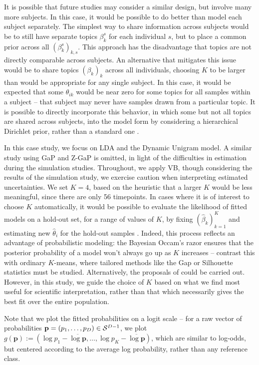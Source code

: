 \documentclass[oupdraft]{bio}
\begin{document}
It is possible that future studies may consider a similar design, but involve
many more subjects. In this case, it would be possible to do better than model
each subject separately. The simplest way to share information across subjects
would be to still have separate topics $\beta_{k}^{s}$ for each individual $s$,
but to place a common prior across all $\left(\beta_{k}^{s}\right)_{k, s}$. This
approach has the disadvantage that topics are not directly comparable across
subjects. An alternative that mitigates this issue would be to share topics
$\left(\beta_{k}\right)_{k}$ across all individuals, choosing $K$ to be larger
than would be appropriate for any single subject. In this case, it would be
expected that some $\theta_{ik}$ would be near zero for some topics for all
samples within a subject -- that subject may never have samples drawn from a
particular topic. It is possible to directly incorporate this behavior, in which
some but not all topics are shared across subjects, into the model form by
considering a hierarchical Dirichlet prior, rather than a standard one
\citep{teh2005sharing}.

In this case study, we focus on LDA and the Dynamic Unigram model. A similar
study using GaP and Z-GaP is omitted, in light of the difficulties in estimation
during the simulation studies. Throughout, we apply VB, though considering the
results of the simulation study, we exercise caution when interpreting estimated
uncertainties. We set $K = 4$, based on the heuristic that a larger $K$ would be
less meaningful, since there are only 56 timepoints. In cases where it is of
interest to choose $K$ automatically, it would be possible to evaluate the
likelihood of fitted models on a hold-out set, for a range of values of $K$, by
fixing $\left(\hat{\beta}_{k}\right)_{k = 1}^{K}$ and estimating new
$\hat{\theta}_{i}$ for the hold-out samples \citep{blei2003latent}. Indeed, this
process reflects an advantage of probabilistic modeling: the Bayesian Occam's
razor ensures that the posterior probability of a model won't always go up as
$K$ increases -- contrast this with ordinary $K$-means, where tailored methods
like the Gap or Silhouette statistics must be studied. Alternatively, the
proposals of \citep{wallach2009evaluation} could be carried out. However, in
this study, we guide the choice of $K$ based on what we find most useful for
scientific interpretation, rather than that which necessarily gives the best fit
over the entire population.

Note that we plot the fitted probabilities on a logit scale -- for a raw vector
of probabilities $\mathbf{p} = \left(p_{1}, \dots, p_{D}\right) \in
\mathcal{S}^{D - 1}$, we plot $g\left(\mathbf{p}\right) := \left(\log p_{1} -
\overline{\log \mathbf{p}}, \dots, \log p_{K} - \overline{\log
  \mathbf{p}}\right)$, which are similar to log-odds, but centered according to
the average log probability, rather than any reference class.
\end{document}
